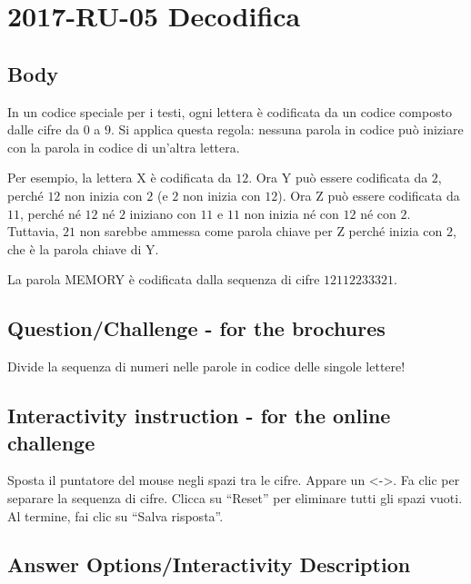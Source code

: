 \documentclass[a4paper,11pt]{report}
\newcommand{\BrochureInlineCode}[1]{{\ttfamily #1}}
\begin{document}
\section*{\centering{} 2017-RU-05 Decodifica}


\subsection*{Body}

In un codice speciale per i testi, ogni lettera è codificata da un codice composto dalle cifre da $0$ a $9$.
Si applica questa regola: nessuna parola in codice può iniziare con la parola in codice di un’altra lettera.

Per esempio, la lettera \BrochureInlineCode{X} è codificata da $12$. Ora \BrochureInlineCode{Y} può essere codificata da $2$, perché $12$ non inizia con $2$ (e $2$ non inizia con $12$). Ora \BrochureInlineCode{Z} può essere codificata da $11$, perché né $12$ né $2$ iniziano con $11$ e $11$ non inizia né con $12$ né con $2$. Tuttavia, $21$ non sarebbe ammessa come parola chiave per \BrochureInlineCode{Z} perché inizia con $2$, che è la parola chiave di \BrochureInlineCode{Y}.

La parola \BrochureInlineCode{MEMORY} è codificata dalla sequenza di cifre $12112233321$.

{\em


\subsection*{Question/Challenge - for the brochures}

Divide la sequenza di numeri nelle parole in codice delle singole lettere!

}


\subsection*{Interactivity instruction - for the online challenge}

Sposta il puntatore del mouse negli spazi tra le cifre. Appare un <->. Fa clic per separare la sequenza di cifre. Clicca su \enquote{Reset} per eliminare tutti gli spazi vuoti. Al termine, fai clic su \enquote{Salva risposta}.

\begingroup
\renewcommand{\arraystretch}{1.5}
\subsection*{Answer Options/Interactivity Description}
\end{document}
